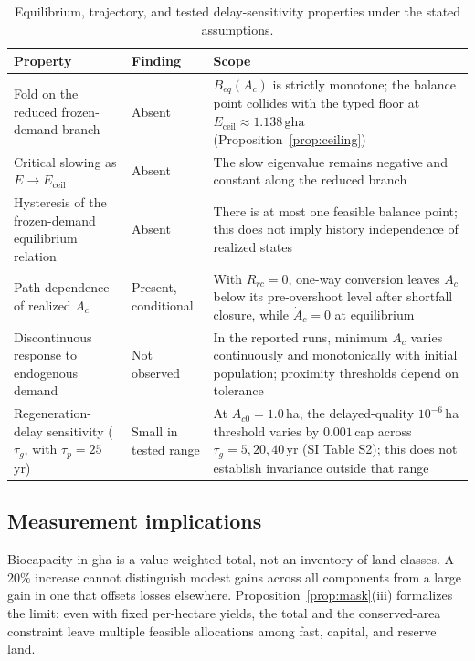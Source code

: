 \documentclass[preprint,12pt,authoryear]{elsarticle}
\newcommand{\Eceil}{E_{\mathrm{ceil}}}
\begin{document}
\begin{table}[!htbp]
\centering\footnotesize
\caption{Equilibrium, trajectory, and tested delay-sensitivity properties under the stated assumptions.}
\label{tab:neg}
\begin{tabularx}{\textwidth}{>{\raggedright\arraybackslash}p{} l >{\raggedright\arraybackslash}X}
\toprule
Property & Finding & Scope \\
\midrule
Fold on the reduced frozen-demand branch & Absent & $B_{eq}(A_c)$ is strictly monotone; the balance point collides with the typed floor at $\Eceil\approx1.138\,\mathrm{gha}$ (Proposition~\ref{prop:ceiling}) \\
Critical slowing as $E\to\Eceil$ & Absent & The slow eigenvalue remains negative and constant along the reduced branch \\
Hysteresis of the frozen-demand equilibrium relation & Absent & There is at most one feasible balance point; this does not imply history independence of realized states \\
Path dependence of realized $A_c$ & Present, conditional & With $R_{rc}=0$, one-way conversion leaves $A_c$ below its pre-overshoot level after shortfall closure, while $\dot A_c=0$ at equilibrium \\
Discontinuous response to endogenous demand & Not observed & In the reported runs, minimum $A_c$ varies continuously and monotonically with initial population; proximity thresholds depend on tolerance \\
Regeneration-delay sensitivity ($\tau_g$, with $\tau_p=25$\,yr) & Small in tested range & At $A_{c0}=1.0$\,ha, the delayed-quality $10^{-6}$\,ha threshold varies by $0.001$\,cap across $\tau_g=5,20,40$\,yr (SI Table S2); this does not establish invariance outside that range \\
\bottomrule
\end{tabularx}
\end{table}
\clearpage

\subsection{Measurement implications}

Biocapacity in gha is a value-weighted total, not an inventory of land classes. A $20\%$ increase cannot distinguish modest gains across all components from a large gain in one that offsets losses elsewhere. Proposition~\ref{prop:mask}(iii) formalizes the limit: even with fixed per-hectare yields, the total and the conserved-area constraint leave multiple feasible allocations among fast, capital, and reserve land.
\end{document}
